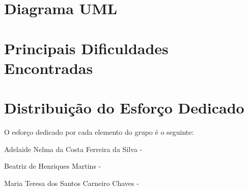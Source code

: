 \documentclass[a4paper]{article}
\begin{document}

\newpage

\section{Diagrama UML}

\newpage

\section{Principais Dificuldades Encontradas}


\newpage

\section{Distribuição do Esforço Dedicado}

O esforço dedicado por cada elemento do grupo é o seguinte: \newline

Adelaide Nelma da Costa Ferreira da Silva - \newline

Beatriz de Henriques Martins - \newline

Maria Teresa dos Santos Carneiro Chaves - 

\newpage
\end{document}
